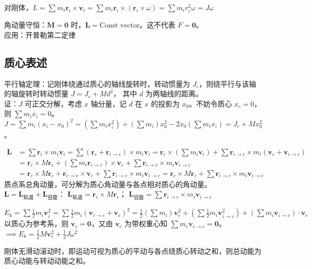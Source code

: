\documentclass[12pt, a4paper, UTF8, openany]{ctexbook}
\newcommand{\vect}[1]{\mathbf{#1}}
\newcommand{\vecr}{\vect{r}}
\newcommand{\vecv}{\vect{v}}
\newcommand{\vecm}{\vect{M}}
\newcommand{\vecl}{\vect{L}}
\newcommand{\cross}{\times}
\begin{document}
        对刚体，$L = \sum m_i \vecr_i \cross \vecv_i = \sum m_i \vecr_i \cross (\vecr_i \cross \omega) 
        = \sum m_i r_i^2 \omega = J\omega$

        角动量守恒：$\vecm = \vect{0}$ 时，$\vecl = \text{Const vector}$。这不代表 $F = \vect{0}$。\\
        {\heiti 应用}：开普勒第二定律

        \subsection{质心表述}
        平行轴定理：记刚体绕通过质心的轴线旋转时，转动惯量为 $J_c$，则绕平行与该轴的轴旋转时转动惯量 $J = J_c + Md^2$，
        其中 $d$ 为两轴线的距离。\\
        证：$J$ 可正交分解，考虑 $x$ 轴分量，记 $d$ 在 $x$ 的投影为 $x_0$。不妨令质心 $x_c = 0$，则 $\sum m_i x_i = 0$。
        $J = \sum m_i (x_i - x_0)^2 = (\sum m_i x_i^2) + (\sum m_i) x_0^2 - 2x_0(\sum m_i x_i) = J_c + Mx_0^2$。

        $\begin{aligned}
            \vecl &= \sum \vecr_i \cross m_i \vecv_i = \sum (\vecr_c + \vecr_{i \to c}) \cross m_i \vecv_i 
            = \vecr_c \cross (\sum m_i \vecv_i) + \sum \vecr_{i \to c} \cross m_i (\vecv_c + \vecv_{i \to c}) \\
            &= \vecr_c \cross M\vecr_c + (\sum m_i \vecr_{i \to c}) \cross \vecv_c 
            + \sum \vecr_{i \to c} \cross m_i \vecv_{i \to c} \\
            &= \vecr_c \cross M\vecr_c + \vecr_{c \to c} \cross \vecv_c + \sum \vecr_{i \to c} \cross m_i \vecv_{i \to c} 
            = \vecr_c \cross M\vecr_c + \sum \vecr_{i \to c} \cross m_i \vecv_{i \to c}
        \end{aligned}$ \\
        质点系总角动量，可分解为质心角动量与各点相对质心的角动量。\\
        $\vecl = \vecl_{\text{轨道}} + \vecl_{\text{自旋}}$：
        $\vecl_{\text{轨道}} = \vecr_c \cross M \vecr_c$；
        $\vecl_{\text{自旋}} = \sum \vecr_{i \to c} \cross m_i \vecv_{i \to c}$

        $E_{k} = \sum \frac{1}{2} m_i \vecv_i^2 = \sum \frac{1}{2} m_i (\vecv_{i \to c} + \vecv_c)^2 
        = \frac{1}{2} (\sum m_i) \vecv_c^2 + (\sum \frac{1}{2} m_i \vecv_{i \to c}^2) 
        + (\sum m_i \vecv_{i \to c}) \cdot \vecv_c$ \\
        以质心为参考系，则 $\vecv_c = \vect{0}$，又由 $\vecv_c$ 为带权重心知 $\sum m_c \vecv_{i \to c} = \vect{0}$。\\
        $\implies E_{k} = \frac{1}{2} M \vecv_c^2 + \frac{1}{2} J\omega^2$

        刚体无滑动滚动时，即运动可视为质心的平动与各点绕质心转动之和，则总动能为质心动能与转动动能之和。
\end{document}
